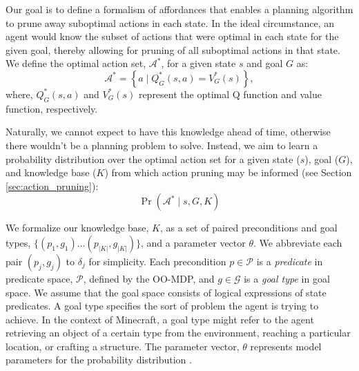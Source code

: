 \documentclass[conference]{IEEEtran}
\newcommand{\dnote}[1]{\textcolor{Green}{\textbf{}}}
\newcommand{\enote}[1]{\textcolor{Red}{\textbf{}}}
\begin{document}
Our goal is to define a formalism of affordances that enables a planning algorithm
to prune away suboptimal actions in each state. In the ideal circumstance, an agent would
know the subset of actions that were optimal in each state for the given goal, thereby allowing for pruning of all suboptimal actions in that state.
We define the optimal action set, $\mathcal{A}^*$, for a given state $s$ and goal $G$ as:
\begin{equation}
\mathcal{A}^* = \left\{ a \mid Q^*_G(s,a) = V^*_G(s) \right\}, 
\label{eq:opt_act_set}
\end{equation}
where, $Q^*_G(s,a)$ and $V^*_G(s)$ represent the optimal Q function and 
value function, respectively. 
\dnote{This makes a pretty big jump from introducing an MDP. Do we need to introduce
the bellman equation/value function above, too?}\enote{I honestly don't think we need to mention the Q fn or V fn since most people have an intuitive sense of "optimal" action and the functions don't have any immediate bearing on anything specific to our research}

Naturally, we cannot expect to have this knowledge ahead of time, otherwise there wouldn't
be a planning problem to solve. Instead, we aim to learn a probability distribution over the optimal
action set for a given state ($s$), goal ($G$), and knowledge base ($K$) from which action pruning may be informed (see Section \ref{sec:action_pruning}):
\begin{equation}
\Pr(\mathcal{A}^* \mid s, G, K)
\label{eq:master}
\end{equation}

We formalize our knowledge base, $K$, as a set of paired preconditions and goal types, $\{ (p_1, g_1) 
\ldots (p_{|K|}, g_{|K|}) \}$,\enote{maybe overly picky but since our KB includes theta isn't it incorrect to say we have |K| deltas} and a parameter vector $\theta$.  We abbreviate
each pair $(p_j, g_j)$ to $\delta_j$ for simplicity. Each precondition $p \in \mathcal{P}$
is a {\it predicate} in predicate space, $\mathcal{P}$, defined by the OO-MDP, and
$g \in \mathcal{G}$ is a {\it goal type} in goal space. We assume that the goal space
consists of logical expressions of state predicates. A goal type specifies the sort of
problem the agent is trying to achieve. In the context of Minecraft, a goal type might refer
to the agent retrieving an object of a certain type from the environment, reaching a particular
location, or crafting a structure. The parameter vector, $\theta$ represents model parameters for the probability distribution \enote{I think it's worthwhile expanding this explanation -- it's not obvious what theta is at a first pass to me}.
\end{document}
